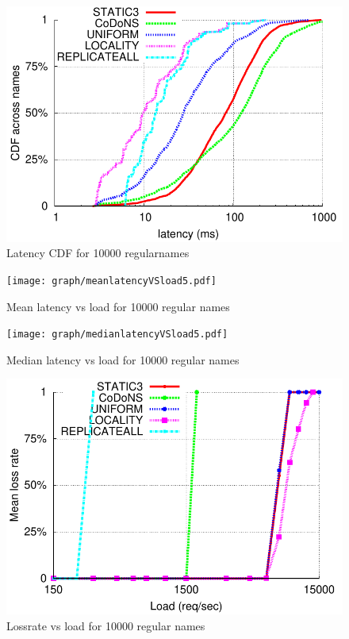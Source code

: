 \begin{figure}[t]
\includegraphics[scale=0.6]{graph/latencycdf.pdf}
\caption{Latency CDF for 10000 regularnames}
\label{fig:lookup4}
\end{figure}

\begin{figure}[t]
\texttt{[image: graph/meanlatencyVSload5.pdf]}
\caption{Mean latency vs load for 10000 regular names}
\label{fig:lookup1}
\end{figure}

\begin{figure}[t]
\texttt{[image: graph/medianlatencyVSload5.pdf]}
\caption{Median latency vs load for 10000 regular names}
\label{fig:lookup2}
\end{figure}

\begin{figure}[t]
\centering
\includegraphics[scale=0.6]{graph/lossrate.pdf}
\caption{Lossrate vs load for 10000 regular names}
\label{fig:lookup3}
\end{figure}

